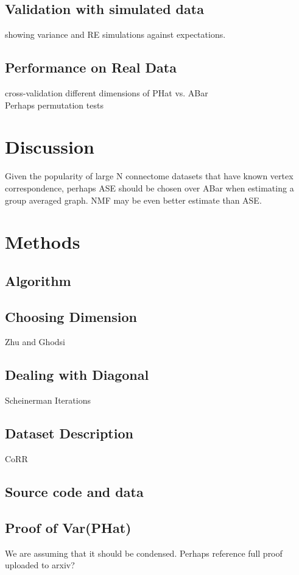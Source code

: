 \documentclass[10pt]{article}
\begin{document}
	\subsection{Validation with simulated data}
		showing variance and RE simulations against expectations.
	\subsection{Performance on Real Data}
		cross-validation different dimensions of PHat vs. ABar\\
		Perhaps permutation tests
		
	\section{Discussion}
	Given the popularity of large N connectome datasets that have known vertex correspondence, perhaps ASE should be chosen over ABar when estimating a group averaged graph.
	NMF may be even better estimate than ASE.
		\cite{Ho2008}
	\section{Methods}
	\subsection{Algorithm}
	\subsection{Choosing Dimension}
	Zhu and Ghodsi
	\subsection{Dealing with Diagonal}
	Scheinerman Iterations
	\subsection{Dataset Description}
	CoRR
	\subsection{Source code and data}
	\subsection{Proof of Var(PHat)}
	We are assuming that it should be condensed. Perhaps reference full proof uploaded to arxiv?
	{}
	
\end{document}
